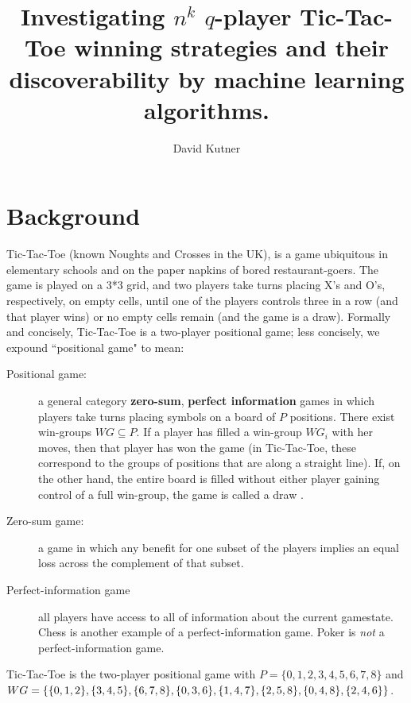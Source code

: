 \documentclass[english, 11pt]{article}
\title{Investigating $n^k$ $q$-player Tic-Tac-Toe winning strategies and their discoverability by machine learning algorithms.}
\author{David Kutner}
\begin{document}
\maketitle
\section*{Background}
Tic-Tac-Toe (known Noughts and Crosses in the UK), is a game ubiquitous in elementary schools and on the paper napkins of bored restaurant-goers. The game is played on a 3*3 grid, and two players take turns placing X's and O's, respectively, on empty cells, until one of the players controls three in a row (and that player wins) or no empty cells remain (and the game is a draw).
Formally and concisely, Tic-Tac-Toe is a two-player positional game; less concisely, we expound ``positional game" to mean:
\begin{description}
\item [Positional game:] a general category \textbf{zero-sum}, \textbf{perfect information} games in which players take turns placing symbols on a board of $P$ positions. There exist win-groups $WG \subseteq P$. If a player has filled a win-group $WG_i$ with her moves, then that player has won the game (in Tic-Tac-Toe, these correspond to the groups of positions that are along a straight line). If, on the other hand, the entire board is filled without either player gaining control of a full win-group, the game is called a draw \cite{krivelevick}.
\item [Zero-sum game:] a game in which any benefit for one subset of the players implies an equal loss across the complement of that subset. 
\item[Perfect-information game] all players have access to all of information about the current gamestate. Chess is another example of a perfect-information game. Poker is \textit{not} a perfect-information game.
\end{description}
Tic-Tac-Toe is the two-player positional game with $P = \{0,1,2,3,4,5,6,7,8\}$ and $WG = \{\{0,1,2\}, \{3,4,5\},\\ \{6,7,8\}, \{0,3,6\}, \{1,4,7\}, \{2,5,8\}, \{0,4,8\}, \{2,4,6\}\}$. 
\end{document}
